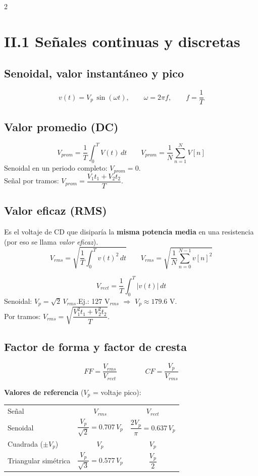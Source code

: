 \documentclass{article}
\begin{document}
\newpage
\begin{multicols}{2}

\section{II.1 Señales continuas y discretas}
\subsection{Senoidal, valor instantáneo y pico}
\[
v(t) = V_p\,\sin(\omega t),\qquad \omega = 2\pi f,\qquad f = \frac{1}{T}
\]

\subsection{Valor promedio (DC)}
\[
V_{prom} = \frac{1}{T}\int_0^T V(t)\,dt \qquad V_{prom} = \frac{1}{N}\sum_{n=1}^{N} V[n]
\]
Senoidal en un periodo completo: $V_{prom} = 0$.\\
Señal por tramos: $V_{prom} = \dfrac{V_1 t_1 + V_2 t_2}{T}$.


\subsection{Valor eficaz (RMS)}
Es el voltaje de CD que disiparía la \textbf{misma potencia media} en una resistencia (por eso se llama \emph{valor eficaz}).
\[
V_{rms} = \sqrt{\frac{1}{T}\int_0^T v(t)^2\,dt} \qquad V_{rms} = \sqrt{\frac{1}{N}\sum_{n=0}^{N-1} v[n]^2}
\]

$$
V_{rect}=\frac{1}{T}\int_0^T |v(t)|\,dt $$
Senoidal: $V_p = \sqrt{2}\,V_{rms}$.\quad Ej.: 127 V$_{rms}$ $\Rightarrow$ $V_p \approx 179.6$ V.\\
Por tramos: $V_{rms} = \sqrt{\dfrac{V_1^2 t_1 + V_2^2 t_2}{T}}$.

\subsection{Factor de forma y factor de cresta}
\[
FF = \frac{V_{rms}}{V_{rect}} \qquad\qquad CF = \frac{V_p}{V_{rms}}
\]
\small


\textbf{Valores de referencia} ($V_p$ = voltaje pico):
\begin{center}
\small
\begin{tabular}{lcc}

Señal & $V_{rms}$ & $V_{rect}$\\
Senoidal & $\dfrac{V_p}{\sqrt{2}} = 0.707\,V_p$ & $\dfrac{2V_p}{\pi} = 0.637\,V_p$\\[8pt]
Cuadrada ($\pm V_p$) & $V_p$ & $V_p$\\[4pt]
Triangular simétrica & $\dfrac{V_p}{\sqrt{3}} = 0.577\,V_p$ & $\dfrac{V_p}{2}$\\


\end{tabular}
\end{center}
\end{multicols}
\end{document}

